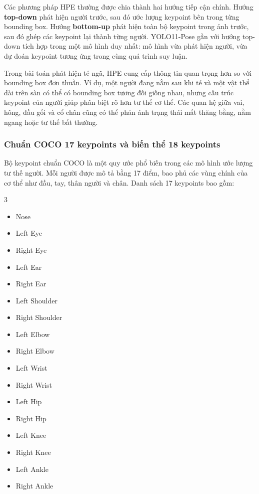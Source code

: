 \documentclass[12pt, a4paper]{article}
\begin{document}
Các phương pháp HPE thường được chia thành hai hướng tiếp cận chính.
Hướng \textbf{top-down} phát hiện người trước, sau đó ước lượng keypoint bên trong từng bounding box.
Hướng \textbf{bottom-up} phát hiện toàn bộ keypoint trong ảnh trước, sau đó ghép các keypoint lại thành từng người.
YOLO11-Pose gần với hướng top-down tích hợp trong một mô hình duy nhất: mô hình vừa phát hiện người, vừa dự đoán keypoint tương ứng trong cùng quá trình suy luận.

Trong bài toán phát hiện té ngã, HPE cung cấp thông tin quan trọng hơn so với bounding box đơn thuần.
Ví dụ, một người đang nằm sau khi té và một vật thể dài trên sàn có thể có bounding box tương đối giống nhau, nhưng cấu trúc keypoint của người giúp phân biệt rõ hơn tư thế cơ thể.
Các quan hệ giữa vai, hông, đầu gối và cổ chân cũng có thể phản ánh trạng thái mất thăng bằng, nằm ngang hoặc tư thế bất thường.

\subsubsection{Chuẩn COCO 17 keypoints và biến thể 18 keypoints}
Bộ keypoint chuẩn COCO là một quy ước phổ biến trong các mô hình ước lượng tư thế người.
Mỗi người được mô tả bằng 17 điểm, bao phủ các vùng chính của cơ thể như đầu, tay, thân người và chân.
Danh sách 17 keypoints bao gồm:
\begin{multicols}{3}
\begin{itemize}[nosep]
  \item[0.] Nose
  \item[1.] Left Eye
  \item[2.] Right Eye
  \item[3.] Left Ear
  \item[4.] Right Ear
  \item[5.] Left Shoulder
  \item[6.] Right Shoulder
  \item[7.] Left Elbow
  \item[8.] Right Elbow
  \item[9.] Left Wrist
  \item[10.] Right Wrist
  \item[11.] Left Hip
  \item[12.] Right Hip
  \item[13.] Left Knee
  \item[14.] Right Knee
  \item[15.] Left Ankle
  \item[16.] Right Ankle
\end{itemize}
\end{multicols}
\end{document}
